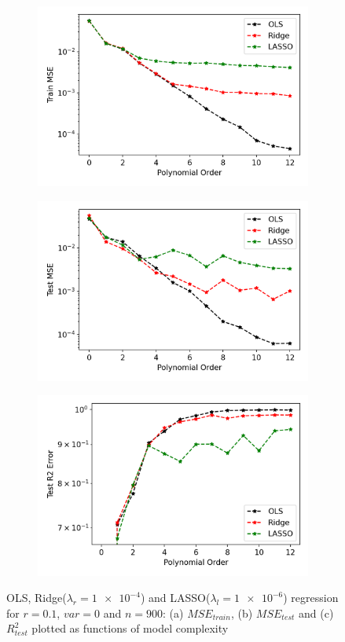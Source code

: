 \begin{figure}
\centering
\begin{subfigure}{.5\textwidth}
  \centering
  \includegraphics[width=.9\linewidth]{Images/orl2.png}
  \caption{}
  \label{fig:orl1}
\end{subfigure}%
\begin{subfigure}{.5\textwidth}
  \centering
  \includegraphics[width=.9\linewidth]{Images/orl1.png}
  \caption{}
  \label{fig:orl2}
\end{subfigure}
\begin{subfigure}{.5\textwidth}
  \centering
  \includegraphics[width=.9\linewidth]{Images/orl3.png}
  \caption{}
  \label{fig:orl3}
\end{subfigure}
\caption{OLS, Ridge($\lambda_r = \num{1e-4}$) and LASSO($\lambda_l = \num{1e-6}$) regression for $r=0.1$, $var=0$ and $n=900$: (a) $MSE_{train}$, (b) $MSE_{test}$ and (c) $R^2_{test}$ plotted as functions of model complexity}
\label{fig:ORL1}
\end{figure}

